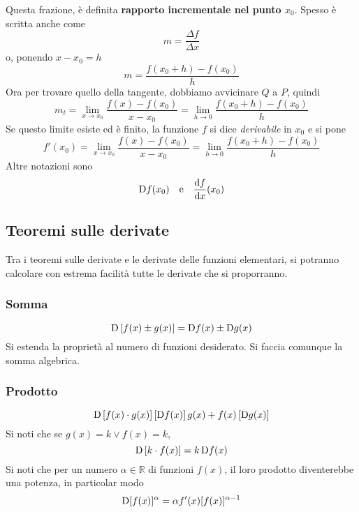 Questa frazione, è definita \textbf{rapporto incrementale nel punto $x_0$}. Spesso è scritta anche
come 
\begin{equation*}
  m = \frac{\Delta f}{\Delta x}
\end{equation*}
o, ponendo $x-x_0 = h$
\begin{equation*}
  m = \frac{f(x_0+h)-f(x_0)}{h}
\end{equation*}
Ora per trovare quello della tangente, dobbiamo avvicinare $Q$ a $P$, quindi
\begin{equation*}
  m_t = \lim\limits_{x\to x_0} \frac{f(x)-f(x_0)}{x-x_0} = 
  \lim\limits_{h\to0} \frac{f(x_0+h)-f(x_0)}{h}
\end{equation*}
Se questo limite esiste ed è finito, la funzione $f$ si dice \emph{derivabile} in $x_0$ e si pone
\begin{equation*}
  f'(x_0) = \lim\limits_{x\to x_0} \frac{f(x)-f(x_0)}{x-x_0} = 
  \lim\limits_{h\to0} \frac{f(x_0+h)-f(x_0)}{h}
\end{equation*}
Altre notazioni sono
\begin{equation*}
  \mathop{}\!\mathrm{D} f(x_0)\quad\text{e}\quad \frac{\mathop{}\!\mathrm{d} f}{\mathop{}\!\mathrm{d} x}(x_0)
\end{equation*}

\subsection{Teoremi sulle derivate}
Tra i teoremi sulle derivate e le derivate delle funzioni elementari, si potranno calcolare con
estrema facilità tutte le derivate che si proporranno.

\subsubsection{Somma}
\begin{equation*}
  \mathop{}\!\mathrm{D} \left[ f(x)\pm g(x) \right] = \mathop{}\!\mathrm{D} f(x)\pm\mathop{}\!\mathrm{D} g(x)
\end{equation*}
Si estenda la proprietà al numero di funzioni desiderato. Si faccia comunque la somma algebrica.

\subsubsection{Prodotto}
\begin{equation*}
  \mathop{}\!\mathrm{D} \left[ f(x)\cdot g(x) \right] \left[ \mathop{}\!\mathrm{D} f(x) \right]g(x) + f(x)\left[ \mathop{}\!\mathrm{D} g(x) \right]
\end{equation*}
Si noti che se $g(x) = k\lor f(x) = k$,
\begin{equation*}
  \mathop{}\!\mathrm{D} \left[ k\cdot f(x) \right] = k\mathop{}\!\mathrm{D} f(x)
\end{equation*}
Si noti che per un numero $\alpha\in\mathbb{R}$ di funzioni $f(x)$, il loro prodotto diventerebbe
una potenza, in particolar modo
\begin{equation*}
  \mathop{}\!\mathrm{D}[f(x)]^\alpha = \alpha f'(x)[f(x)]^{\alpha-1}
\end{equation*}

